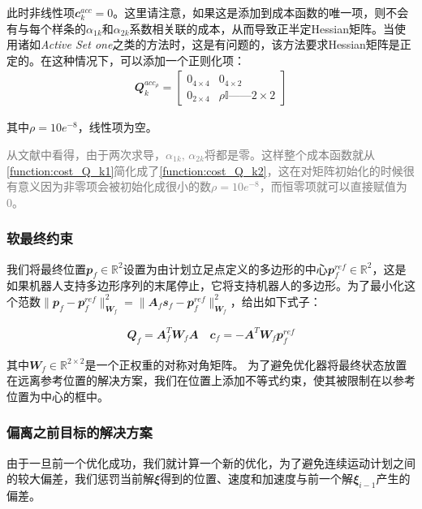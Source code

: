 此时非线性项$\mathbfit{c}_k^{acc}=0$。这里请注意，如果这是添加到成本函数的唯一项，则不会有与每个样条的$\alpha_{1k}$和$\alpha_{2k}$系数相关联的成本，从而导致正半定Hessian矩阵。当使用诸如\emph{Active Set one}\cite[p]{Goldfarb_Idnani_1983}之类的方法时，这是有问题的，该方法要求Hessian矩阵是正定的。在这种情况下，可以添加一个正则化项：
\begin{align}
    \label{function:cost_Q_k2}
    \mathbfit{Q}_k^{acc_{\rho}}=\begin{bmatrix}
        0_{4\times4} & 0_{4\times2}\\
        0_{2\times4} & \rho \mathbb{I}——{2\times2}
    \end{bmatrix}
\end{align}

其中$\rho=10e^{{-8}}$，线性项为空。

\textcolor{gray}{\small
    从文献\cite[p]{Goldfarb_Idnani_1983}中看得，由于两次求导，$\alpha_{1k}, \, \alpha_{2k}$将都是零。这样整个成本函数就从\eqref{function:cost_Q_k1}简化成了\eqref{function:cost_Q_k2}，这在对矩阵初始化的时候很有意义因为非零项会被初始化成很小的数$\rho=10e^{-8}$，而恒零项就可以直接赋值为0。
}
\subsubsection{软最终约束\label{section:soft_final_constrants}}

我们将最终位置$\mathbfit{p}_f\in\mathbb{R}^2$设置为由计划立足点定义的多边形的中心$\mathbfit{p}_f^{ref}\in\mathbb{R}^2$，这是如果机器人支持多边形序列的末尾停止，它将支持机器人的多边形。为了最小化这个范数$\|\mathbfit{p}_f-\mathbfit{p}_f^{ref}\|^2_{\mathbfit{W}_f}=\|\mathbfit{A}_f\mathbfit{s}_f-\mathbfit{p}_f^{ref}\|^2_{\mathbfit{W}_f}$，给出如下式子：

\begin{align}
    \mathbfit{Q}_f=\mathbfit{A}_f^T \mathbfit{W}_f \mathbfit{A} \quad \mathbfit{c}_f=-\mathbfit{A}^T \mathbfit{W}_f \mathbfit{p}_f^{ref}
\end{align}

其中$\mathbfit{W}_f \in \mathbb{R}^{2\times2}$是一个正权重的对称对角矩阵。
为了避免优化器将最终状态放置在远离参考位置的解决方案，我们在位置上添加不等式约束，使其被限制在以参考位置为中心的框中。

\subsubsection{偏离之前目标的解决方案\label{section:deviation_previous}}
由于一旦前一个优化成功，我们就计算一个新的优化，为了避免连续运动计划之间的较大偏差，我们惩罚当前解$\mathbfit{\xi}$得到的位置、速度和加速度与前一个解$\mathbfit{\xi}_{i-1}$产生的偏差。

